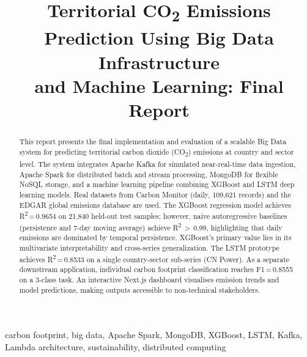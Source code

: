 \documentclass[conference]{IEEEtran}
\begin{document}
\title{Territorial CO\textsubscript{2} Emissions Prediction Using Big Data Infrastructure\\
and Machine Learning: Final Report}

\author{
}

\maketitle

\begin{abstract}
This report presents the final implementation and evaluation of a scalable
Big Data system for predicting territorial carbon dioxide (CO\textsubscript{2}) emissions
at country and sector level.
The system integrates Apache Kafka for simulated near-real-time data ingestion, Apache
Spark for distributed batch and stream processing, MongoDB for flexible NoSQL
storage, and a machine learning pipeline combining XGBoost and LSTM deep
learning models.
Real datasets from Carbon Monitor (daily, 109{,}621 records) and the EDGAR
global emissions database are used.
The XGBoost regression model achieves R\textsuperscript{2}\,=\,0.9654 on
21{,}840 held-out test samples; however, naive autoregressive baselines
(persistence and 7-day moving average) achieve R\textsuperscript{2}\,$>$\,0.99,
highlighting that daily emissions are dominated by temporal persistence.
XGBoost's primary value lies in its multivariate interpretability and
cross-series generalization.
The LSTM prototype achieves R\textsuperscript{2}\,=\,0.8533 on a single
country-sector sub-series (CN Power).
As a separate downstream application, individual carbon footprint classification
reaches F1\,=\,0.8555 on a 3-class task.
An interactive Next.js dashboard visualises emission trends and
model predictions, making outputs accessible to non-technical stakeholders.
\end{abstract}

\begin{IEEEkeywords}
carbon footprint, big data, Apache Spark, MongoDB, XGBoost, LSTM, Kafka,
Lambda architecture, sustainability, distributed computing
\end{IEEEkeywords}
\end{document}
